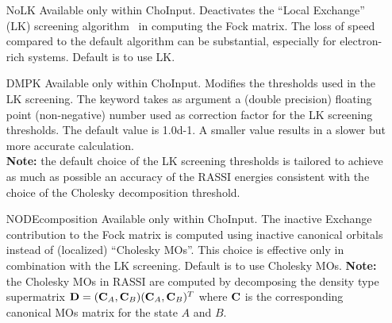 \begin{keywordlist}
\begin{itemize}
\item[NoLK]
Available only within ChoInput. Deactivates the ``Local Exchange'' (LK) screening algorithm~\cite{Aquilante:07a} in computing
the Fock matrix. The loss of speed compared to the default algorithm can be substantial, especially for electron-rich systems.
Default is to use LK.
\item[DMPK]
Available only within ChoInput. Modifies the thresholds used in the LK screening.
The keyword takes as argument a (double precision) floating point (non-negative) number used
as correction factor for the LK screening thresholds.
The default value is 1.0d-1. A smaller value results in a slower but more accurate calculation.\\
{\bf Note:} the default choice of the LK screening thresholds is tailored to achieve as much as possible an
accuracy of the RASSI energies consistent with the choice of the Cholesky decomposition
threshold.
\item[NODEcomposition]
Available only within ChoInput. The inactive Exchange contribution to the Fock matrix is computed using inactive canonical orbitals
instead of (localized) ``Cholesky MOs''.
This choice is effective only in combination with the LK screening.
Default is to use Cholesky MOs. {\bf Note:} the Cholesky MOs in RASSI are computed by decomposing the
density type supermatrix ${\bf D}=({\bf C}_A , {\bf C}_B)({\bf C}_A , {\bf C}_B)^T$ where ${\bf C}$ is the corresponding canonical
MOs matrix for the state $A$ and $B$.

\end{itemize}
\end{keywordlist}
